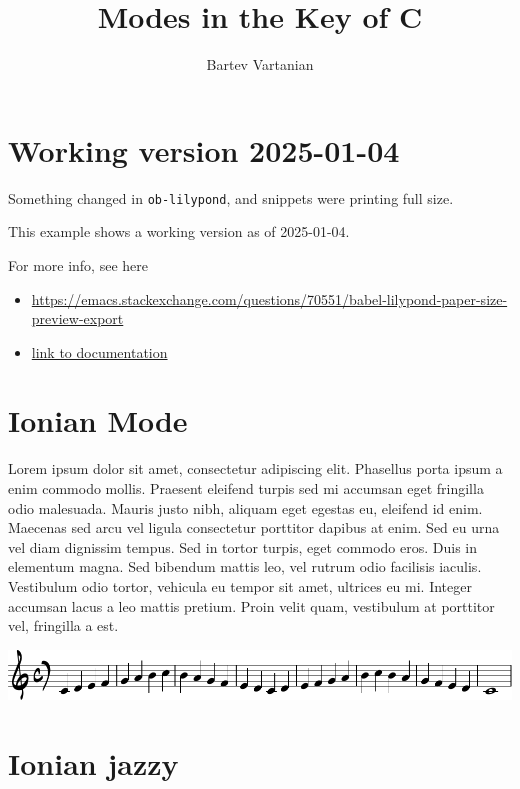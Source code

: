 \documentclass[11pt]{article}
\author{Bartev Vartanian}
\date{}
\title{Modes in the Key of C}
\begin{document}
\maketitle

\section*{Working version 2025-01-04}
\label{sec:org27327f6}

Something changed in \texttt{ob-lilypond}, and snippets were printing full size.

This example shows a working version as of 2025-01-04.

For more info, see here
\begin{itemize}
\item \url{https://emacs.stackexchange.com/questions/70551/babel-lilypond-paper-size-preview-export}
\item \href{https://lilypond.org/doc/v2.24/Documentation/usage/other-programs}{link to documentation}
\end{itemize}

\section*{Ionian Mode}
\label{sec:orga4536e7}

Lorem ipsum dolor sit amet, consectetur adipiscing elit. Phasellus
porta ipsum a enim commodo mollis. Praesent eleifend turpis sed mi
accumsan eget fringilla odio malesuada. Mauris justo nibh, aliquam
eget egestas eu, eleifend id enim. Maecenas sed arcu vel ligula
consectetur porttitor dapibus at enim. Sed eu urna vel diam dignissim
tempus. Sed in tortor turpis, eget commodo eros. Duis in elementum
magna. Sed bibendum mattis leo, vel rutrum odio facilisis iaculis.
Vestibulum odio tortor, vehicula eu tempor sit amet, ultrices eu mi.
Integer accumsan lacus a leo mattis pretium. Proin velit quam,
vestibulum at porttitor vel, fringilla a est.

\begin{center}
\includegraphics[width=.9\linewidth]{ionian.pdf}
\end{center}

\section*{Ionian jazzy}
\label{sec:orgefeef21}
\end{document}
